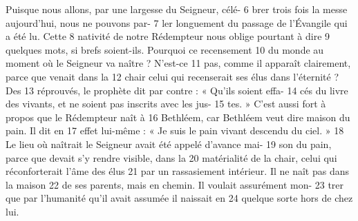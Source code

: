 Puisque nous allons, par une largesse du Seigneur, célé-	 
6	 	brer trois fois la messe aujourd'hui, nous ne pouvons par-	 
7	 	ler longuement du passage de l'Évangile qui a été lu. Cette	 
8	 	nativité de notre Rédempteur nous oblige pourtant à dire	 
9	 	quelques mots, si brefs soient-ils. Pourquoi ce recensement	 
10	 	du monde au moment où le Seigneur va naître ? N'est-ce	 
11	 	pas, comme il apparaît clairement, parce que venait dans la	 
12	 	chair celui qui recenserait ses élus dans l'éternité ? Des	 
13	 	réprouvés, le prophète dit par contre : « Qu'ils soient effa-	 
14	 	cés du livre des vivants, et ne soient pas inscrits avec les jus-	 
15	 	tes. » C'est aussi fort à propos que le Rédempteur naît à	 
16	 	Bethléem, car Bethléem veut dire maison du pain. Il dit en	 
17	 	effet lui-même : « Je suis le pain vivant descendu du ciel. »	 
18	 	Le lieu où naîtrait le Seigneur avait été appelé d'avance mai-	 
19	 	son du pain, parce que devait s'y rendre visible, dans la	 
20	 	matérialité de la chair, celui qui réconforterait l'âme des élus	 
21	 	par un rassasiement intérieur. Il ne naît pas dans la maison	 
22	 	de ses parents, mais en chemin. Il voulait assurément mon-	 
23	 	trer que par l'humanité qu'il avait assumée il naissait en	 
24	 	quelque sorte hors de chez lui.